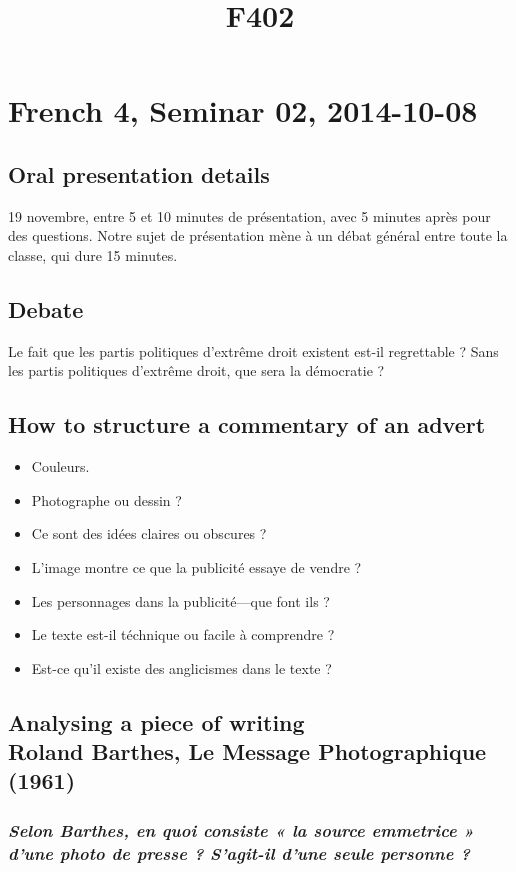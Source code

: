 \documentclass[12pt]{article}
\title{F402}
\begin{document}
\section*{French 4, Seminar 02, 2014-10-08}

\subsection*{Oral presentation details}

19 novembre, entre 5 et 10 minutes de présentation, avec 5 minutes après pour des questions. Notre sujet de présentation mène à un débat général entre toute la classe, qui dure 15 minutes.

\subsection*{Debate}

Le fait que les partis politiques d'extrême droit existent est-il regrettable ? Sans les partis politiques d'extrême droit, que sera la démocratie ?

\subsection*{How to structure a commentary of an advert}

\begin{itemize}
  \item{Couleurs.}
  \item{Photographe ou dessin ?}
  \item{Ce sont des idées claires ou obscures ?}
  \item{L'image montre ce que la publicité essaye de vendre ?}
  \item{Les personnages dans la publicité---que font ils ?}
  \item{Le texte est-il téchnique ou facile à comprendre ?}
  \item{Est-ce qu'il existe des anglicismes dans le texte ?}
\end{itemize}

\subsection*{Analysing a piece of writing\\ Roland Barthes, Le Message Photographique (1961)}

\subsubsection*{\textit{Selon Barthes, en quoi consiste « la source emmetrice » d'une photo de presse ? S'agit-il d'une seule personne ?}}
\end{document}
